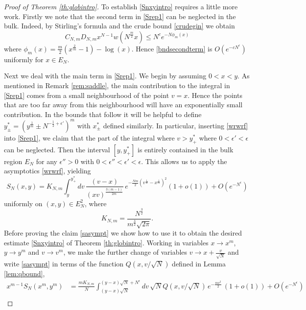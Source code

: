 \documentclass[11pt,reqno]{amsproc}
\numberwithin{equation}{section}
\numberwithin{theorem}{section}
\begin{document}
\begin{proof}[Proof of Theorem \ref{th:globintro}]
To establish \eqref{Snxyintro} requires a little more work. Firstly we note that the second term in \eqref{Srep1} can be neglected in the bulk. Indeed, by Stirling's formula and the crude bound \eqref{crudegin} we obtain
\begin{equation}
C_{N,m}D_{N,m}x^{N-1}w(N^{\frac{m}{2}}x) \leq N^{c}e^{-N\phi_{m}(x)} \label{bndsecondterm}
\end{equation}
where $\phi_{m}(x) = \frac{m}{2}\left(x^{\frac{2}{m}}-1\right)-\log(x)$. Hence \eqref{bndsecondterm} is $O(e^{-cN^{\epsilon}})$ uniformly for $x \in E_{N}$.

Next we deal with the main term in \eqref{Srep1}. We begin by assuming $0<x<y$. As mentioned in Remark \ref{rem:saddle}, the main contribution to the integral in \eqref{Srep1} comes from a small neighbourhood of the point $v=x$. Hence the points that are too far away from this neighbourhood will have an exponentially small contribution. In the bounds that follow it will be helpful to define $y^{*}_{\pm} =\left(y^{\frac{1}{m}}\pm N^{-\frac{1}{2}+\epsilon'}\right)^{m}$ with $x^{*}_{\pm}$ defined similarly. In particular, inserting \eqref{wrwrf} into \eqref{Srep1}, we claim that the part of the integral where $v > y_{+}^{*}$ where $0 < \epsilon' < \epsilon$ can be neglected. Then the interval $[y,y_{+}^{*}]$ is entirely contained in the bulk region $E_{N}$ for any $\epsilon''>0$ with $0 < \epsilon'' < \epsilon' < \epsilon$. This allows us to apply the asymptotics \eqref{wrwrf}, yielding
\begin{equation}
S_{N}(x,y) = K_{N,m}\int_{y}^{y^{*}_{+}}dv\,\frac{(v-x)}{(xv)^{\frac{3(m-1)}{2m}}}\,e^{-\frac{Nm}{2}(v^{\frac{1}{m}}-x^{\frac{1}{m}})^{2}}(1+o(1)) + O(e^{-N^{\epsilon}})\label{sasympt}
\end{equation}
uniformly on $(x,y) \in E_{N}^{2}$, where 
\begin{equation}
K_{N,m} = \frac{N^{\frac{3}{2}}}{m^{\frac{3}{2}}\sqrt{2\pi}}.
\end{equation}
Before proving the claim \eqref{sasympt} we show how to use it to obtain the desired estimate \eqref{Snxyintro} of Theorem \ref{th:globintro}. Working in variables $x \to x^{m}$, $y \to y^{m}$ and $v \to v^{m}$, we make the further change of variables $v \to x+\frac{v}{\sqrt{N}}$ and write \eqref{sasympt} in terms of the function $Q(x,v/\sqrt{N})$ defined in Lemma \ref{lem:qbound},
\begin{align}
x^{m-1}S_{N}(x^{m},y^{m}) &= \frac{mK_{N,m}}{N}\int_{(y-x)\sqrt{N}}^{(y-x)\sqrt{N}+N^{\epsilon}}dv\,\sqrt{N}Q(x,v/\sqrt{N})\,e^{-\frac{mv^{2}}{2}}\,(1+o(1))+O(e^{-N^{\epsilon}})\\

\end{align}
\end{proof}
\end{document}
